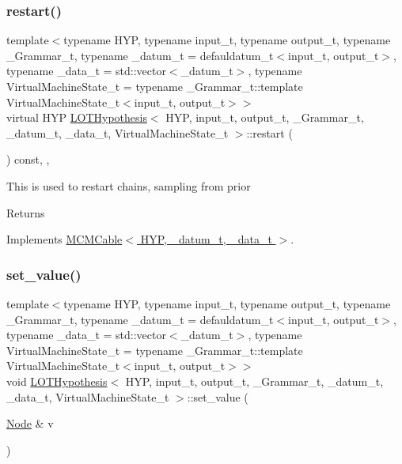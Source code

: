 \subsubsection{\texorpdfstring{restart()}{restart()}}
{\footnotesize\ttfamily template$<$typename H\+YP, typename input\+\_\+t, typename output\+\_\+t, typename \+\_\+\+Grammar\+\_\+t, typename \+\_\+datum\+\_\+t = defauldatum\+\_\+t$<$input\+\_\+t, output\+\_\+t$>$, typename \+\_\+data\+\_\+t = std\+::vector$<$\+\_\+datum\+\_\+t$>$, typename Virtual\+Machine\+State\+\_\+t = typename \+\_\+\+Grammar\+\_\+t\+::template Virtual\+Machine\+State\+\_\+t$<$input\+\_\+t, output\+\_\+t$>$$>$ \\
virtual H\+YP \hyperlink{class_l_o_t_hypothesis}{L\+O\+T\+Hypothesis}$<$ H\+YP, input\+\_\+t, output\+\_\+t, \+\_\+\+Grammar\+\_\+t, \+\_\+datum\+\_\+t, \+\_\+data\+\_\+t, Virtual\+Machine\+State\+\_\+t $>$\+::restart (\begin{DoxyParamCaption}{ }\end{DoxyParamCaption}) const\hspace{0.3cm}{\ttfamily [inline]}, {\ttfamily [override]}, {\ttfamily [virtual]}}

This is used to restart chains, sampling from prior \begin{DoxyReturn}{Returns}

\end{DoxyReturn}


Implements \hyperlink{class_m_c_m_cable_a220d6c4ca73e20441c14fa5bd3e090d3}{M\+C\+M\+Cable$<$ H\+Y\+P, \+\_\+datum\+\_\+t, \+\_\+data\+\_\+t $>$}.

\mbox{\label{class_l_o_t_hypothesis_aac23de5143f24323a05ed32774387ff7}} 
\subsubsection{\texorpdfstring{set\+\_\+value()}{set\_value()}\hspace{0.1cm}{\footnotesize\ttfamily [1/2]}}
{\footnotesize\ttfamily template$<$typename H\+YP, typename input\+\_\+t, typename output\+\_\+t, typename \+\_\+\+Grammar\+\_\+t, typename \+\_\+datum\+\_\+t = defauldatum\+\_\+t$<$input\+\_\+t, output\+\_\+t$>$, typename \+\_\+data\+\_\+t = std\+::vector$<$\+\_\+datum\+\_\+t$>$, typename Virtual\+Machine\+State\+\_\+t = typename \+\_\+\+Grammar\+\_\+t\+::template Virtual\+Machine\+State\+\_\+t$<$input\+\_\+t, output\+\_\+t$>$$>$ \\
void \hyperlink{class_l_o_t_hypothesis}{L\+O\+T\+Hypothesis}$<$ H\+YP, input\+\_\+t, output\+\_\+t, \+\_\+\+Grammar\+\_\+t, \+\_\+datum\+\_\+t, \+\_\+data\+\_\+t, Virtual\+Machine\+State\+\_\+t $>$\+::set\+\_\+value (\begin{DoxyParamCaption}\item[{\hyperlink{class_node}{Node} \&}]{v }\end{DoxyParamCaption})\hspace{0.3cm}{\ttfamily [inline]}}

